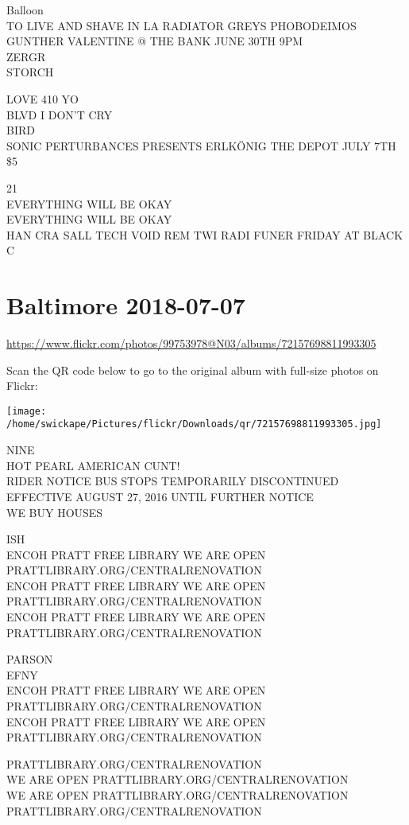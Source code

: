 \documentclass[10pt,letterpaper]{article}
\begin{document}
Balloon\\
TO LIVE AND SHAVE IN LA RADIATOR GREYS PHOBODEIMOS GUNTHER VALENTINE @ THE BANK JUNE 30TH 9PM\\
ZERGR\\
STORCH

LOVE 410 YO\\
BLVD I DON'T CRY\\
BIRD\\
SONIC PERTURBANCES PRESENTS ERLKÖNIG THE DEPOT JULY 7TH \$5

21\\
EVERYTHING WILL BE OKAY\\
EVERYTHING WILL BE OKAY\\
HAN CRA SALL TECH VOID REM TWI RADI FUNER FRIDAY AT BLACK C


\section*{Baltimore 2018-07-07}

\url{https://www.flickr.com/photos/99753978@N03/albums/72157698811993305}

Scan the QR code below to go to the original album with full-size photos on Flickr:

\texttt{[image: /home/swickape/Pictures/flickr/Downloads/qr/72157698811993305.jpg]}


NINE\\
HOT PEARL AMERICAN CUNT!\\
RIDER NOTICE BUS STOPS TEMPORARILY DISCONTINUED EFFECTIVE AUGUST 27, 2016 UNTIL FURTHER NOTICE\\
WE BUY HOUSES

ISH\\
ENCOH PRATT FREE LIBRARY WE ARE OPEN PRATTLIBRARY.ORG/CENTRALRENOVATION\\
ENCOH PRATT FREE LIBRARY WE ARE OPEN PRATTLIBRARY.ORG/CENTRALRENOVATION\\
ENCOH PRATT FREE LIBRARY WE ARE OPEN PRATTLIBRARY.ORG/CENTRALRENOVATION

PARSON\\
EFNY\\
ENCOH PRATT FREE LIBRARY WE ARE OPEN PRATTLIBRARY.ORG/CENTRALRENOVATION\\
ENCOH PRATT FREE LIBRARY WE ARE OPEN PRATTLIBRARY.ORG/CENTRALRENOVATION

PRATTLIBRARY.ORG/CENTRALRENOVATION\\
WE ARE OPEN PRATTLIBRARY.ORG/CENTRALRENOVATION\\
WE ARE OPEN PRATTLIBRARY.ORG/CENTRALRENOVATION\\
PRATTLIBRARY.ORG/CENTRALRENOVATION
\end{document}
